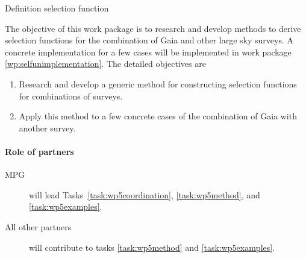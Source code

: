 \begin{workpackage}{Definition selection function}
  \label{wp:selfuncombine}
  \wpend{\duration} %

  \makewptable %

  \begin{wpobjectives}
    The objective of this work package is to research and develop methods to derive selection functions for the combination of Gaia and other large sky surveys. A concrete implementation for a few cases will be implemented in work package \ref{wp:selfunimplementation}. The detailed objectives are
    \begin{enumerate}
      \item Research and develop a generic method for constructing selection functions for combinations of surveys.
      \item Apply this method to a few concrete cases of the combination of Gaia with another survey.
    \end{enumerate}
  \end{wpobjectives}

  \begin{wpdescription}

    \paragraph{Role of partners}
    \begin{description}
      \item[MPG] will lead Tasks~\ref{task:wp5coordination}, \ref{task:wp5method}, and \ref{task:wp5examples}.
      \item[All other partners] will contribute to tasks \ref{task:wp5method} and \ref{task:wp5examples}.
    \end{description}
  \end{wpdescription}


\end{workpackage}
